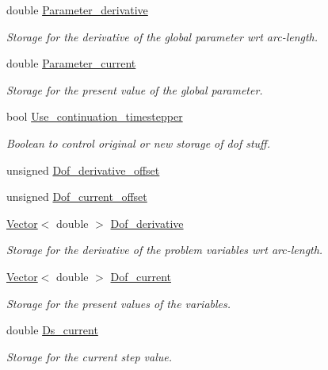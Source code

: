 \begin{DoxyCompactItemize}
double \hyperlink{classoomph_1_1Problem_aa5082325ca4cafe5a9ec03ef79c67a6f}{Parameter\+\_\+derivative}
\begin{DoxyCompactList}\small\item\em Storage for the derivative of the global parameter wrt arc-\/length. \end{DoxyCompactList}\item 
double \hyperlink{classoomph_1_1Problem_a8e29673eb80559888d1c6148c4f11e57}{Parameter\+\_\+current}
\begin{DoxyCompactList}\small\item\em Storage for the present value of the global parameter. \end{DoxyCompactList}\item 
bool \hyperlink{classoomph_1_1Problem_adbecce0cb1bd7b6b21285568e41ee3eb}{Use\+\_\+continuation\+\_\+timestepper}
\begin{DoxyCompactList}\small\item\em Boolean to control original or new storage of dof stuff. \end{DoxyCompactList}\item 
unsigned \hyperlink{classoomph_1_1Problem_af0372f742b90bb402c6edc720ceeb421}{Dof\+\_\+derivative\+\_\+offset}
\item 
unsigned \hyperlink{classoomph_1_1Problem_a57825be8c76db9e23e6a9aa0d73973b2}{Dof\+\_\+current\+\_\+offset}
\item 
\hyperlink{classoomph_1_1Vector}{Vector}$<$ double $>$ \hyperlink{classoomph_1_1Problem_a1861321b2d129707935bf1191238daca}{Dof\+\_\+derivative}
\begin{DoxyCompactList}\small\item\em Storage for the derivative of the problem variables wrt arc-\/length. \end{DoxyCompactList}\item 
\hyperlink{classoomph_1_1Vector}{Vector}$<$ double $>$ \hyperlink{classoomph_1_1Problem_a366b50c490e9fd3ddafa05b2fbd0b883}{Dof\+\_\+current}
\begin{DoxyCompactList}\small\item\em Storage for the present values of the variables. \end{DoxyCompactList}\item 
double \hyperlink{classoomph_1_1Problem_ad412d49617d0b0998e5eb440c7a20f3f}{Ds\+\_\+current}
\begin{DoxyCompactList}\small\item\em Storage for the current step value. \end{DoxyCompactList}\item 

\end{DoxyCompactItemize}
